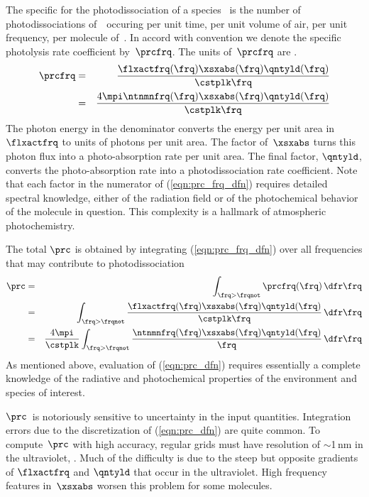 \documentclass[12pt]{article}
\begin{document}
The specific  for the
photodissociation of a species \A\ is the number of photodissociations
of~\A\ occuring per unit time, per unit volume of air, per unit
frequency, per molecule of~\A. 
In accord with convention we denote the specific photolysis rate
coefficient by~$\prcfrq$.
The units of~$\prcfrq$ are \xshz.
\begin{eqnarray}
\prcfrq & = & 
\frac{\flxactfrq(\frq) \xsxabs(\frq) \qntyld(\frq)}{\cstplk \frq}
\nonumber \\
& = & 
\frac{4 \mpi \ntnmnfrq(\frq) \xsxabs(\frq) \qntyld(\frq)}{\cstplk \frq}
\label{eqn:prc_frq_dfn}
\end{eqnarray}
The photon energy in the denominator converts the energy per unit area
in~$\flxactfrq$ to units of photons per unit area.
The factor of~$\xsxabs$ turns this photon flux into a photo-absorption rate
per unit area.
The final factor, $\qntyld$, converts the photo-absorption rate
into a photodissociation rate coefficient.
Note that each factor in the numerator of (\ref{eqn:prc_frq_dfn}) 
requires detailed spectral knowledge, either of the radiation field or
of the photochemical behavior of the molecule in question.
This complexity is a hallmark of atmospheric photochemistry.

The total  $\prc$ is obtained
by integrating (\ref{eqn:prc_frq_dfn}) over all frequencies that may
contribute to photodissociation 
\begin{eqnarray}
\prc & = & \int_{\frq > \frqnot} \prcfrq(\frq) \,\dfr\frq
\nonumber \\
& = & \int_{\frq > \frqnot} 
\frac{\flxactfrq(\frq) \xsxabs(\frq) \qntyld(\frq)}
{\cstplk \frq} \,\dfr\frq \nonumber \\
& = & \frac{4\mpi}{\cstplk} 
\int_{\frq > \frqnot} 
\frac{\ntnmnfrq(\frq) \xsxabs(\frq) \qntyld(\frq)}{\frq} 
\,\dfr\frq
\label{eqn:prc_dfn}
\end{eqnarray}
As mentioned above, evaluation of (\ref{eqn:prc_dfn}) requires
essentially a complete knowledge of the radiative and photochemical
properties of the environment and species of interest.

$\prc$~is notoriously sensitive to uncertainty in the input quantities. 
Integration errors due to the discretization of (\ref{eqn:prc_dfn})
are quite common. 
To compute~$\prc$ with high accuracy, regular grids must have
resolution of $\sim$1\,nm in the ultraviolet, \cite[]{Mad89}.
Much of the difficulty is due to the steep but opposite gradients 
of $\flxactfrq$ and $\qntyld$ that occur in the ultraviolet.
High frequency features in~$\xsxabs$ worsen this problem for some
molecules.
\end{document}
